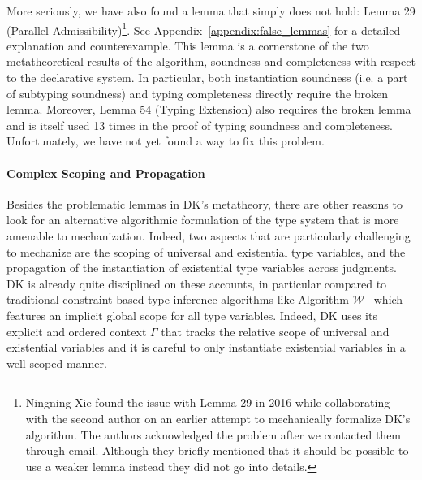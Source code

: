 
More seriously, we have also found a lemma that simply does not hold:
Lemma 29 (Parallel Admissibility)\footnote{Ningning Xie found the issue with Lemma 29 in 2016 while
  collaborating with the second author on an earlier attempt to mechanically
  formalize DK's algorithm. The authors acknowledged the problem after we contacted them through email.
  Although they briefly mentioned that it should be possible to use a weaker lemma instead they did
  not go into details.}.
See Appendix~\ref{appendix:false_lemmas} for a detailed explanation
and counterexample. This lemma is a cornerstone of the two metatheoretical results 
of the algorithm, soundness and completeness with respect to the declarative system.
In particular, both instantiation soundness (i.e. a part of subtyping
soundness) and typing completeness directly require the broken lemma.
Moreover, Lemma 54 (Typing Extension) also requires the broken lemma and is
itself used 13 times in the proof of typing soundness and completeness.
Unfortunately, we have not yet found a way to fix this problem.

\paragraph{Complex Scoping and Propagation}

Besides the problematic lemmas in DK's metatheory, there are other reasons to
look for an alternative algorithmic formulation of the type system that is more
amenable to mechanization. Indeed, two aspects that are particularly
challenging to mechanize are the scoping of universal and existential type
variables, and the propagation of the instantiation of existential type
variables across judgments. 
DK is already quite disciplined on these accounts, in particular compared to
traditional constraint-based type-inference algorithms like Algorithm $\mathcal{W}$~\cite{milner1978theory} which
features an implicit global scope for all type variables. Indeed, DK uses its
explicit and ordered context $\Gamma$ that tracks the relative scope of universal and
existential variables and it is careful to only instantiate existential
variables in a well-scoped manner.

